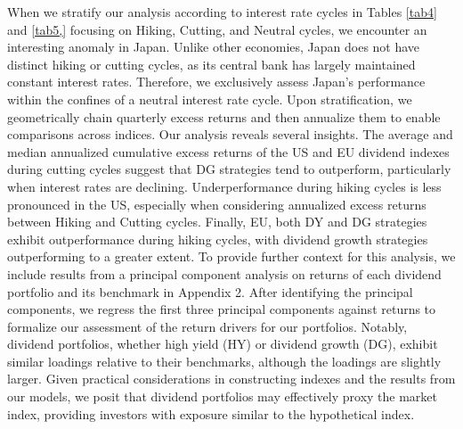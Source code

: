 \documentclass[11pt,preprint, authoryear]{elsarticle}
\numberwithin{equation}{section}
\numberwithin{figure}{section}
\numberwithin{table}{section}
\begin{document}
When we stratify our analysis according to interest rate cycles in
Tables \ref{tab4} and \ref{tab5,} focusing on Hiking, Cutting, and
Neutral cycles, we encounter an interesting anomaly in Japan. Unlike
other economies, Japan does not have distinct hiking or cutting cycles,
as its central bank has largely maintained constant interest rates.
Therefore, we exclusively assess Japan's performance within the confines
of a neutral interest rate cycle. Upon stratification, we geometrically
chain quarterly excess returns and then annualize them to enable
comparisons across indices. Our analysis reveals several insights. The
average and median annualized cumulative excess returns of the US and EU
dividend indexes during cutting cycles suggest that DG strategies tend
to outperform, particularly when interest rates are declining.
Underperformance during hiking cycles is less pronounced in the US,
especially when considering annualized excess returns between Hiking and
Cutting cycles. Finally, EU, both DY and DG strategies exhibit
outperformance during hiking cycles, with dividend growth strategies
outperforming to a greater extent. To provide further context for this
analysis, we include results from a principal component analysis on
returns of each dividend portfolio and its benchmark in Appendix 2.
After identifying the principal components, we regress the first three
principal components against returns to formalize our assessment of the
return drivers for our portfolios. Notably, dividend portfolios, whether
high yield (HY) or dividend growth (DG), exhibit similar loadings
relative to their benchmarks, although the loadings are slightly larger.
Given practical considerations in constructing indexes and the results
from our models, we posit that dividend portfolios may effectively proxy
the market index, providing investors with exposure similar to the
hypothetical index.
\end{document}

